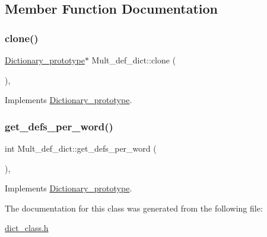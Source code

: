 \subsection{Member Function Documentation}
\mbox{\label{class_mult__def__dict_ab9f196ca32bb48e465ded573e8484db6}} 
\subsubsection{\texorpdfstring{clone()}{clone()}}
{\footnotesize\ttfamily \mbox{\hyperlink{class_dictionary__prototype}{Dictionary\+\_\+prototype}}$\ast$ Mult\+\_\+def\+\_\+dict\+::clone (\begin{DoxyParamCaption}{ }\end{DoxyParamCaption})\hspace{0.3cm}{\ttfamily [inline]}, {\ttfamily [virtual]}}



Implements \mbox{\hyperlink{class_dictionary__prototype_ac06fe410a511be7ee85ba07cf69b9418}{Dictionary\+\_\+prototype}}.

\mbox{\label{class_mult__def__dict_a623909670ca67cedb3f112dfade592c6}} 
\subsubsection{\texorpdfstring{get\_defs\_per\_word()}{get\_defs\_per\_word()}}
{\footnotesize\ttfamily int Mult\+\_\+def\+\_\+dict\+::get\+\_\+defs\+\_\+per\+\_\+word (\begin{DoxyParamCaption}{ }\end{DoxyParamCaption})\hspace{0.3cm}{\ttfamily [inline]}, {\ttfamily [virtual]}}



Implements \mbox{\hyperlink{class_dictionary__prototype_a4f9e8f9c02d878faac1021f9c31da736}{Dictionary\+\_\+prototype}}.



The documentation for this class was generated from the following file\+:\begin{DoxyCompactItemize}
\item 
\mbox{\hyperlink{dict__class_8h}{dict\+\_\+class.\+h}}\end{DoxyCompactItemize}
